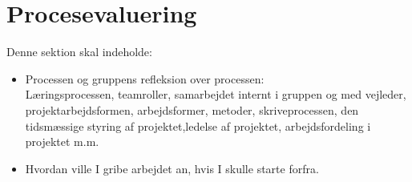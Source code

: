 \section{Procesevaluering}
Denne sektion skal indeholde:

\begin{itemize}
    \item Processen og gruppens refleksion over processen:\\ 
    Læringsprocessen, teamroller, samarbejdet internt i gruppen og med vejleder, projektarbejdsformen, arbejdsformer, metoder, skriveprocessen, den tidsmæssige styring af projektet,ledelse af projektet, arbejdsfordeling i projektet m.m.
    \item Hvordan ville I gribe arbejdet an, hvis I skulle starte forfra.
\end{itemize}{}
